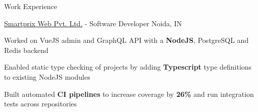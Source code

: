 \documentclass[../resume.tex]{subfiles}
\begin{document}
\begin{rSection}{Work Experience}
\begin{rSubsection}
\end{rSubsection}

\begin{rSubsection}
    {\href{https://go.rohit.page/smpx}{Smartprix Web Pvt. Ltd.}}
    {  -  }
    {Software Developer}
    {Noida, IN}

    \item Worked on VueJS admin and GraphQL API with a \textbf{NodeJS}, PostgreSQL and Redis backend
    \item Enabled static type checking of projects by adding \textbf{Typescript} type definitions to existing NodeJS modules
    \item Built automated \textbf{CI pipelines} to increase coverage by \textbf{26\%} and run integration tests across repositories

\end{rSubsection}


\end{rSection}
\end{document}
